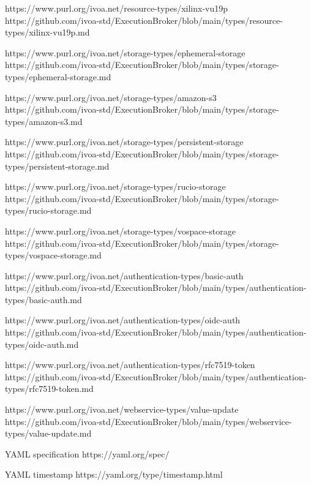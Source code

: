 \documentclass[11pt,a4paper]{ivoa}
\begin{document}
https://www.purl.org/ivoa.net/resource-types/xilinx-vu19p
https://github.com/ivoa-std/ExecutionBroker/blob/main/types/resource-types/xilinx-vu19p.md

https://www.purl.org/ivoa.net/storage-types/ephemeral-storage
https://github.com/ivoa-std/ExecutionBroker/blob/main/types/storage-types/ephemeral-storage.md

https://www.purl.org/ivoa.net/storage-types/amazon-s3
https://github.com/ivoa-std/ExecutionBroker/blob/main/types/storage-types/amazon-s3.md

https://www.purl.org/ivoa.net/storage-types/persistent-storage
https://github.com/ivoa-std/ExecutionBroker/blob/main/types/storage-types/persistent-storage.md

https://www.purl.org/ivoa.net/storage-types/rucio-storage
https://github.com/ivoa-std/ExecutionBroker/blob/main/types/storage-types/rucio-storage.md

https://www.purl.org/ivoa.net/storage-types/vospace-storage
https://github.com/ivoa-std/ExecutionBroker/blob/main/types/storage-types/vospace-storage.md

https://www.purl.org/ivoa.net/authentication-types/basic-auth
https://github.com/ivoa-std/ExecutionBroker/blob/main/types/authentication-types/basic-auth.md

https://www.purl.org/ivoa.net/authentication-types/oidc-auth
https://github.com/ivoa-std/ExecutionBroker/blob/main/types/authentication-types/oidc-auth.md

https://www.purl.org/ivoa.net/authentication-types/rfc7519-token
https://github.com/ivoa-std/ExecutionBroker/blob/main/types/authentication-types/rfc7519-token.md

https://www.purl.org/ivoa.net/webservice-types/value-update
https://github.com/ivoa-std/ExecutionBroker/blob/main/types/webservice-types/value-update.md

YAML specification
https://yaml.org/spec/

YAML timestamp
https://yaml.org/type/timestamp.html


\end{document}
